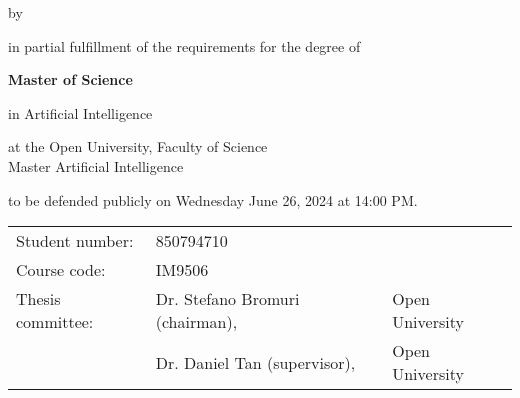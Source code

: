 \begin{titlepage}

\begin{center}


\vspace*{2\bigskipamount}

{\makeatletter
\titlestyle\color{red}\Huge\@title
\makeatother}

{\makeatletter
\ifx\@subtitle\undefined\else
    \bigskip
    \titlefont\titleshape\LARGE\@subtitle
\fi
\makeatother}

\bigskip
\bigskip

by

\bigskip
\bigskip

{\makeatletter
\titlefont\Large\bfseries\@author
\makeatother}

\vfill

in partial fulfillment of the requirements for the degree of

\bigskip
\bigskip

{\bfseries Master of Science}

in Artificial Intelligence

\bigskip
\bigskip

at the Open University, Faculty of Science \\
Master Artificial Intelligence

to be defended publicly on Wednesday June 26, 2024 at 14:00 PM.

\vfill

\begin{tabular}{lll}
    Student number: & 850794710 \\
    Course code: & IM9506 \\
    Thesis committee:
        & Dr. Stefano Bromuri (chairman), & Open University \\
        & Dr. Daniel Tan (supervisor), & Open University
\end{tabular}

\bigskip


\bigskip

\end{center}

\end{titlepage} 
